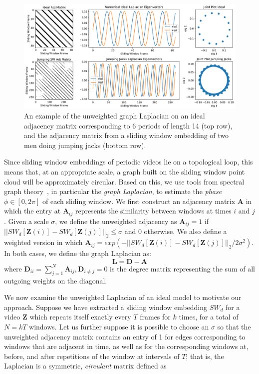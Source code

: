 \documentclass{article}
\newcommand{\mb}{\mathbf}
\begin{document}
\begin{figure}
\centering
\includegraphics[width=\columnwidth]{CirculantExample.pdf}
\caption{An example of the unweighted graph Laplacian on an ideal adjacency matrix corresponding to 6 periods of length 14 (top row), and the adjacency matrix from a sliding window embedding of two men doing jumping jacks (bottom row).  }
\label{fig:CirculantExample}
\end{figure}

Since sliding window embeddings of periodic videos lie on a topological loop, this means that, at an appropriate scale, a graph built on the sliding window point cloud will be approximately circular.  Based on this, we use tools from spectral graph theory~\cite{chung1997spectral}, in particular the {\em graph Laplacian}, to estimate the {\em phase} $\phi \in [0, 2 \pi]$ of each sliding window. We first construct an adjacency matrix $\mb{A}$ in which the entry at $\mb{A}_{ij}$ represents the similarity between windows at times $i$ and $j$.  Given a scale $\sigma$, we define the unweighted adjacency as $\mb{A}_{ij} = 1$ if $||SW_{d}[\mb{Z}(i)] - SW_{d}[\mb{Z}(j)]||_2 \leq \sigma$ and 0 otherwise. We also define a weighted version in which $\mb{A}_{ij} = exp(-||SW_{d}[\mb{Z}(i)] - SW_{d}[\mb{Z}(j)]||_2/2\sigma^2)$. In both cases, we define the graph Laplacian as:
\begin{equation}
	\mb{L} = \mb{D}-\mb{A}
\end{equation}
where $\mb{D}_{ii} = \sum_{j = 1}^N \mb{A}_{ij}, \mb{D}_{i \neq j} = 0$ is the degree matrix representing the sum of all outgoing weights on the diagonal.  

We now examine the unweighted Laplacian of an ideal model to motivate our approach.  Suppose we have extracted a sliding window embedding $SW_{d}$ for a video $\mb{Z}$ which repeats itself exactly every $T$ frames for $k$ times, for a total of $N = kT$ windows.  Let us further suppose it is possible to choose an $\sigma$ so that the unweighted adjacency matrix contains an entry of 1 for edges corresponding to windows that are adjacent in time, as well as for the corresponding windows at, before, and after repetitions of the window at intervals of $T$; that is, the Laplacian is a symmetric, {\em circulant} matrix defined as
\end{document}
